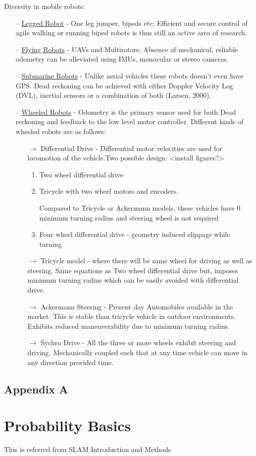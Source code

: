 \documentclass{article}
\begin{document}
Diversity in mobile robots:
\begin{itemize}[noitemsep,topsep=10pt]
\item[--] 	
\setul{1pt}{.4pt}\ul{Legged Robot} - One leg jumper, bipeds etc; Efficient and secure control of agile walking
or running biped robots is thus still an active area
of research.
\item[--]
\setul{1pt}{.4pt}\ul{Flying Robots} - UAVs and Multirotors; Absence of mechanical, reliable odometry can be alleviated using IMUs, monocular or stereo cameras. 
\item[--]
\setul{1pt}{.4pt}\ul{Submarine Robots} - Unlike aerial vehicles these robots doesn't even have GPS. Dead reckoning can be achieved with either
Doppler Velocity Log (DVL), inertial sensors or
a combination of both (Larsen, 2000).
\item[--]
\setul{1pt}{.4pt}\ul{Wheeled Robots} - Odometry is the primary sensor used for both Dead reckoning and feedback to the low level motor controller. Different kinds of wheeled robots are as follows:
\begin{itemize}
	\item[$\rightarrow$] Differential Drive -  Differential motor velocities are used for locomotion of the vehicle.Two possible design: <install figures?>
	\begin{enumerate}
		\item Two wheel differential drive
		\item Tricycle with two wheel motors and encoders.
		 
		Compared to Tricycle or Ackermann models, these vehicles have $0$ minimum turning radius and steering wheel is not required
		\item Four wheel differential drive - geometry induced slippage while turning
	
	\end{enumerate}
	\item[$\rightarrow$] Tricycle model - where there will be same wheel for driving as well as steering. Same equations as Two wheel differential drive but, imposes minimum turning radius which can be easily avoided with differential drive. 
	\item[$\rightarrow$] Ackermann Steering - Present day Automobiles available in the market. This is stable than tricycle vehicle in outdoor environments. Exhibits reduced maneuverability due to minimum turning radius. 
	\item[$\rightarrow$] Sychro Drive - All the three or more wheels exhibit steering and driving. Mechanically coupled such that at any time vehicle can move in any direction provided time.  
\end{itemize}


\end{itemize}
\newpage
\begin{center}
	\section*{Appendix A}
\end{center}
\section*{Probability Basics}
This is referred from SLAM Introduction and Methods
\end{document}
